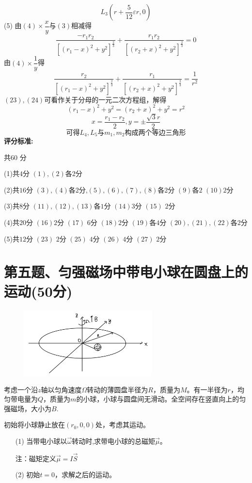 \documentclass{article}
\begin{document}
\[
L_3\left(r+\dfrac{5}{12}\varepsilon r,0\right)\tag{22}
\]
(5)
由$(4)\times \dfrac{x}{y}$与$(3)$相减得
\[
\dfrac{-r_1 r_2}{[(r_1-x)^2+y^2]^{\frac{2}{3}}}
+\dfrac{r_1 r_2}{[(r_2+x)^2+y^2]^{\frac{2}{3}}}
=0\tag{23}
\]
由$(4)\times \dfrac{1}{y}$得
\[
\dfrac{r_2}{[(r_1-x)^2+y^2]^{\frac{2}{3}}}
+\dfrac{r_1}{[(r_2+x)^2+y^2]^{\frac{2}{3}}}
=\dfrac{1}{r^2}\tag{24}
\]
$(23),(24)$可看作关于分母的一元二次方程组，解得
\[
(r_1-x)^2+y^2=(r_2+x)^2+y^2=r^2\tag{25}
\]
\[
x=\dfrac{r_1-r_2}{2},y=\pm\dfrac{\sqrt{3}r}{2}\tag{26}
\]
\[
可得L_4,L_5与 m_1,m_2构成两个等边三角形\tag{27}
\]
\textbf{评分标准:}\par
共$60$ 分\par
(1)共$4$分 $(1),(2)$各$2$分\par
(2)共$16$分 $(3),(4)$各$2$分,$(5),(6),(7),(8)$各$2$分 $(9)$各$2$ $(10)$$2$分\par
(3)共$8$分 $(11),(12),(13)$各$1$分 $(14)$$3$分 $(15)$ $2$分\par
(4)共$20$分 $(16)$$2$分 $(17)$ $6$分 $(18)$$2$分 $(19)$各$4$分 $(20),(21),(22)$各$2$分\par
(5)共$12$分 $(23)$ $2$分 $(25)$ $4$分 $(26)$ $4$分 $(27)$ $2$分\par

\section*{第五题、匀强磁场中带电小球在圆盘上的运动(50分)}
\begin{figure}
	\vspace{-15pt}    %
	\includegraphics[width=7cm]{img/5.1.jpeg}\\
	\vspace{-15pt}    %
	\vspace{-15pt}    %
\end{figure}
考虑一个沿$z$轴以匀角速度$\Omega$转动的薄圆盘半径为$R$，质量为$M$。有一半径为$r$，均匀带电量为$Q$，质量为$m$的小球，小球与圆盘间无滑动。全空间存在竖直向上的匀强磁场，大小为$B$.\par
初始将小球静止放在$(r_0,0,0)$处，考虑其运动。\par
\begin{itemize}
\item[(1)]当带电小球以$\vec{\omega}$转动时,求带电小球的总磁矩$\vec{\mu}$。\par
注：磁矩定义$\vec{\mu}=I\vec{S}$\par
\item[(2)]初始$t=0$，求解之后的运动。
\end{itemize}
\end{document}
